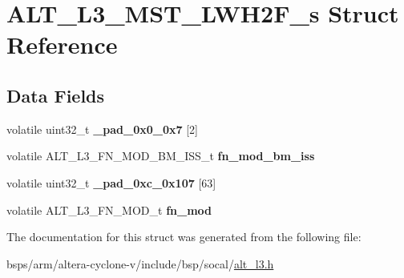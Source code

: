 \hypertarget{structALT__L3__MST__LWH2F__s}{}\section{A\+L\+T\+\_\+\+L3\+\_\+\+M\+S\+T\+\_\+\+L\+W\+H2\+F\+\_\+s Struct Reference}
\label{structALT__L3__MST__LWH2F__s}
\subsection*{Data Fields}
\begin{DoxyCompactItemize}
\item 
\mbox{\label{structALT__L3__MST__LWH2F__s_af512797ad423fa82f752fc9f73dccdaf}} 
volatile uint32\+\_\+t {\bfseries \+\_\+pad\+\_\+0x0\+\_\+0x7} \mbox{[}2\mbox{]}
\item 
\mbox{\label{structALT__L3__MST__LWH2F__s_af64f3c9e659db7f42e2a4d9eae28645e}} 
volatile A\+L\+T\+\_\+\+L3\+\_\+\+F\+N\+\_\+\+M\+O\+D\+\_\+\+B\+M\+\_\+\+I\+S\+S\+\_\+t {\bfseries fn\+\_\+mod\+\_\+bm\+\_\+iss}
\item 
\mbox{\label{structALT__L3__MST__LWH2F__s_ab1b68639fe6b3b3218647b717635ef09}} 
volatile uint32\+\_\+t {\bfseries \+\_\+pad\+\_\+0xc\+\_\+0x107} \mbox{[}63\mbox{]}
\item 
\mbox{\label{structALT__L3__MST__LWH2F__s_adc3dc8fc178c6d8bab40a9281fbba655}} 
volatile A\+L\+T\+\_\+\+L3\+\_\+\+F\+N\+\_\+\+M\+O\+D\+\_\+t {\bfseries fn\+\_\+mod}
\end{DoxyCompactItemize}


The documentation for this struct was generated from the following file\+:\begin{DoxyCompactItemize}
\item 
bsps/arm/altera-\/cyclone-\/v/include/bsp/socal/\mbox{\hyperlink{alt__l3_8h}{alt\+\_\+l3.\+h}}\end{DoxyCompactItemize}
